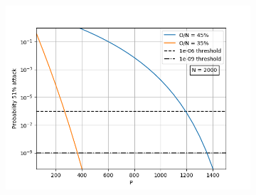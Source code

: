 \begin{figure}[H]
\centering
 \begin{subfigure}[b]{0.45\textwidth}
        \includegraphics[width=\textwidth]{Figures/Prob51_vs_P_N2000_O35_to_45}


\end{subfigure}
\end{figure}
